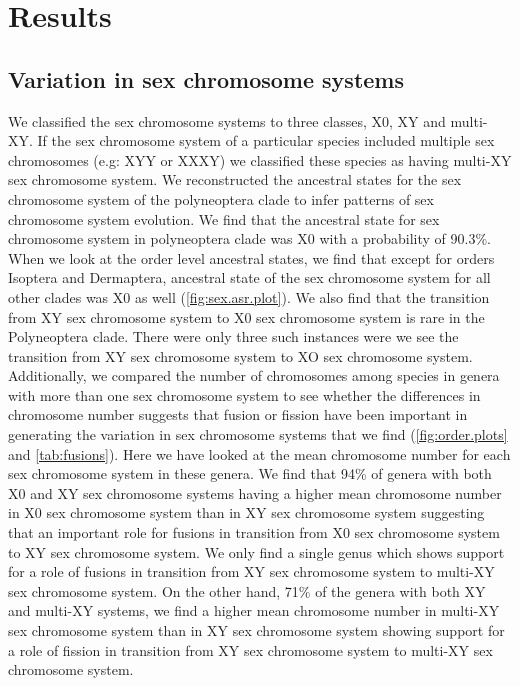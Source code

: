 \section{Results}

\subsection{Variation in sex chromosome systems}
We classified the sex chromosome systems to three classes, X0, XY and multi-XY.
If the sex chromosome system of a particular species included multiple sex chromosomes (e.g: XYY or XXXY) we classified these species as having multi-XY sex chromosome system.
We reconstructed the ancestral states for the sex chromosome system of the polyneoptera clade to infer patterns of sex chromosome system evolution.
We find that the ancestral state for sex chromosome system in polyneoptera clade was X0 with a probability of 90.3\%.
When we look at the order level ancestral states, we find that except for orders Isoptera and Dermaptera, ancestral state of the sex chromosome system for all other clades was X0 as well (\cref{fig:sex.asr.plot}).
We also find that the transition from XY sex chromosome system to X0 sex chromosome system is rare in the Polyneoptera clade. 
There were only three such instances were we see the transition from XY sex chromosome system to XO sex chromosome system.
Additionally, we compared the number of chromosomes among species in genera with more than one sex chromosome system to see whether the differences in chromosome number suggests that fusion or fission have been important in generating the variation in sex chromosome systems that we find (\cref{fig:order.plots} and \cref{tab:fusions}).
Here we have looked at the mean chromosome number for each sex chromosome system in these genera.
We find that 94\% of genera with both X0 and XY sex chromosome systems having a higher mean chromosome number in X0 sex chromosome system than in XY sex chromosome system suggesting that an important role for fusions in transition from X0 sex chromosome system to XY sex chromosome system.
We only find a single genus which shows support for a role of fusions in transition from XY sex chromosome system to multi-XY sex chromosome system.
On the other hand, 71\% of the genera with both XY and multi-XY systems, we find a higher mean chromosome number in multi-XY sex chromosome system than in XY sex chromosome system showing support for a role of fission in transition from XY sex chromosome system to multi-XY sex chromosome system.


